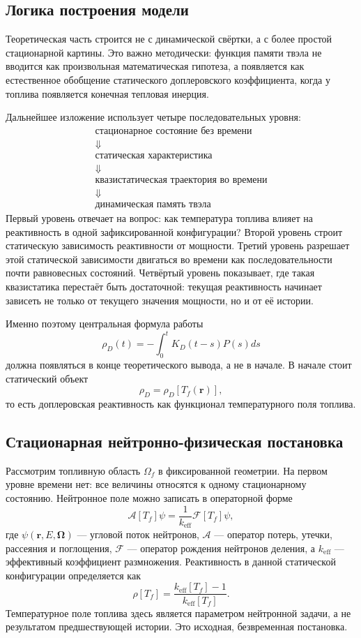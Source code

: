 \documentclass[12pt]{article}
\begin{document}
\subsection{Логика построения модели}

Теоретическая часть строится не с динамической свёртки, а с более простой стационарной картины. Это важно методически: функция памяти твэла не вводится как произвольная математическая гипотеза, а появляется как естественное обобщение статического доплеровского коэффициента, когда у топлива появляется конечная тепловая инерция.

Дальнейшее изложение использует четыре последовательных уровня:
\[
\boxed{
\begin{gathered}
\text{стационарное состояние без времени}\\
\Downarrow\\
\text{статическая характеристика}\\
\Downarrow\\
\text{квазистатическая траектория во времени}\\
\Downarrow\\
\text{динамическая память твэла}
\end{gathered}
}
\]
Первый уровень отвечает на вопрос: как температура топлива влияет на реактивность в одной зафиксированной конфигурации? Второй уровень строит статическую зависимость реактивности от мощности. Третий уровень разрешает этой статической зависимости двигаться во времени как последовательности почти равновесных состояний. Четвёртый уровень показывает, где такая квазистатика перестаёт быть достаточной: текущая реактивность начинает зависеть не только от текущего значения мощности, но и от её истории.

Именно поэтому центральная формула работы
\[
\rho_D(t)=-\int_0^t K_D(t-s)P(s)ds
\]
должна появляться в конце теоретического вывода, а не в начале. В начале стоит статический объект
\[
\rho_D=\rho_D[T_f(\mathbf r)],
\]
то есть доплеровская реактивность как функционал температурного поля топлива.

\subsection{Стационарная нейтронно-физическая постановка}

Рассмотрим топливную область \(\Omega_f\) в фиксированной геометрии. На первом уровне времени нет: все величины относятся к одному стационарному состоянию. Нейтронное поле можно записать в операторной форме
\[
\mathcal A[T_f]\psi
=
\frac{1}{k_{\mathrm{eff}}}
\mathcal F[T_f]\psi,
\]
где \(\psi(\mathbf r,E,\boldsymbol{\Omega})\) --- угловой поток нейтронов, \(\mathcal A\) --- оператор потерь, утечки, рассеяния и поглощения, \(\mathcal F\) --- оператор рождения нейтронов деления, а \(k_{\mathrm{eff}}\) --- эффективный коэффициент размножения. Реактивность в данной статической конфигурации определяется как
\[
\rho[T_f]
=
\frac{k_{\mathrm{eff}}[T_f]-1}{k_{\mathrm{eff}}[T_f]}.
\]
Температурное поле топлива здесь является параметром нейтронной задачи, а не результатом предшествующей истории. Это исходная, безвременная постановка.
\end{document}
